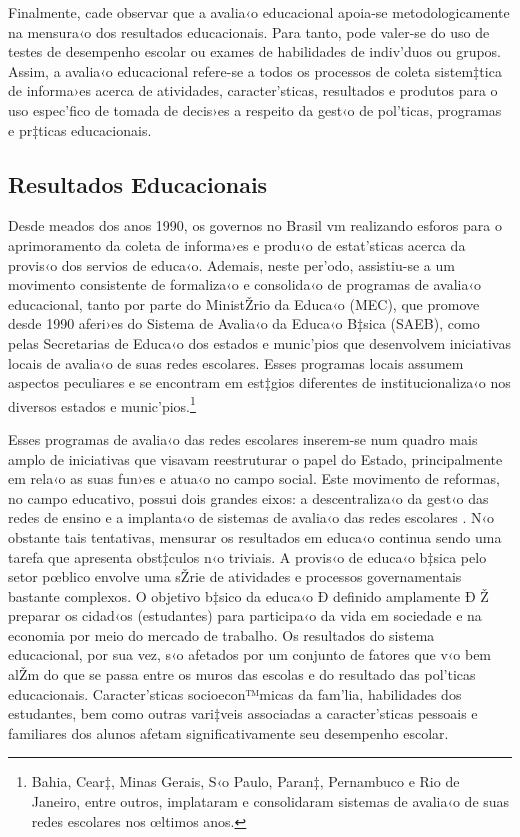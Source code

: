 \documentclass[a4paper, 12pt]{article}
\begin{document}
Finalmente, cade observar que a avalia‹o educacional apoia-se metodologicamente na mensura‹o dos resultados educacionais. Para tanto, pode valer-se do uso de testes de desempenho escolar ou exames de habilidades de indiv’duos ou grupos. Assim, a avalia‹o educacional refere-se a todos os processos de coleta sistem‡tica de informa›es acerca de atividades, caracter’sticas, resultados e produtos para o uso espec’fico de tomada de decis›es a respeito da gest‹o de pol’ticas, programas e pr‡ticas educacionais. 

\subsection{Resultados Educacionais}

Desde meados dos anos 1990, os governos no Brasil vm realizando esforos para o aprimoramento da coleta de informa›es e produ‹o de estat’sticas acerca da provis‹o dos servios de educa‹o. Ademais, neste per’odo, assistiu-se a um movimento consistente de formaliza‹o e consolida‹o de programas de avalia‹o educacional, tanto por parte do MinistŽrio da Educa‹o (MEC), que promove desde 1990 aferi›es do Sistema de Avalia‹o da Educa‹o B‡sica (SAEB), como pelas Secretarias de Educa‹o dos estados e munic’pios  que desenvolvem iniciativas locais de avalia‹o de suas redes escolares. Esses programas locais assumem aspectos peculiares e se encontram em est‡gios diferentes de institucionaliza‹o nos diversos estados e munic’pios.\footnote{Bahia, Cear‡, Minas Gerais, S‹o Paulo, Paran‡, Pernambuco e Rio de Janeiro, entre outros, implataram e consolidaram sistemas de avalia‹o de suas redes escolares nos œltimos anos.}

Esses programas de avalia‹o das redes escolares inserem-se num quadro mais amplo de iniciativas que visavam reestruturar o papel do Estado, principalmente em rela‹o as suas fun›es e atua‹o no campo social. Este movimento de reformas, no campo educativo, possui dois grandes eixos: a descentraliza‹o da gest‹o das redes de ensino e a implanta‹o de sistemas de avalia‹o das redes escolares \cite{castro_como_2003}.
N‹o obstante tais tentativas, mensurar os resultados em educa‹o continua sendo uma tarefa que apresenta obst‡culos n‹o triviais. A provis‹o de educa‹o b‡sica pelo setor pœblico envolve uma sŽrie de atividades e processos governamentais bastante complexos. O objetivo b‡sico da educa‹o Ð definido amplamente Ð Ž preparar os cidad‹os (estudantes) para participa‹o da vida em sociedade e na economia por meio do mercado de trabalho. Os resultados do sistema educacional, por sua vez, s‹o afetados por um conjunto de fatores que v‹o bem alŽm do que se passa entre os muros das escolas e do resultado das pol’ticas educacionais. Caracter’sticas socioecon™micas da fam’lia, habilidades dos estudantes, bem como outras vari‡veis associadas a caracter’sticas pessoais e familiares dos alunos afetam significativamente seu desempenho escolar.
\end{document}
